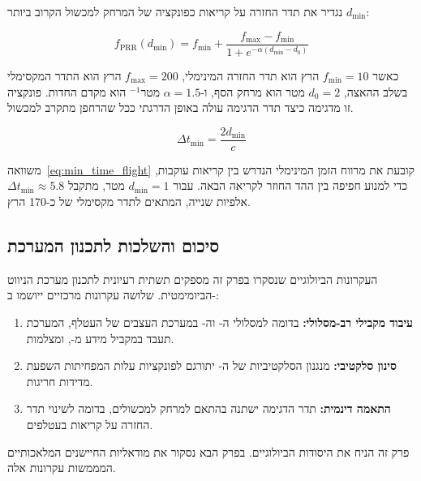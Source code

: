 נגדיר את תדר החזרה על קריאות כפונקציה של המרחק למכשול הקרוב ביותר
$d_{\min}$:

\begin{equation}
    f_{\text{PRR}}(d_{\min}) = f_{\min} +
    \frac{f_{\max} - f_{\min}}{1 + e^{-\alpha(d_{\min} - d_0)}}
    \label{eq:bat_pulse_rate}
\end{equation}

כאשר $f_{\min} = 10$ הרץ הוא תדר החזרה המינימלי,
$f_{\max} = 200$ הרץ הוא התדר המקסימלי בשלב ההאצה,
$d_0 = 2$ מטר הוא מרחק הסף, ו-$\alpha = 1.5$ מטר$^{-1}$ הוא
מקדם החדות. פונקציה זו מדגימה כיצד תדר הדגימה עולה באופן
הדרגתי ככל שהרחפן מתקרב למכשול.

\begin{equation}
    \Delta t_{\text{min}} = \frac{2 d_{\min}}{c}
    \label{eq:min_time_flight}
\end{equation}

משוואה~\ref{eq:min_time_flight} קובעת את מרווח הזמן המינימלי
הנדרש בין קריאות עוקבות, כדי למנוע חפיפה בין ההד החוזר
לקריאה הבאה. עבור $d_{\min} = 1$ מטר, מתקבל
$\Delta t_{\text{min}} \approx 5.8$ אלפיות שנייה,
המתאים לתדר מקסימלי של כ-170 הרץ.

\subsection{סיכום והשלכות לתכנון המערכת}
\label{subsec:bio_summary}

העקרונות הביולוגיים שנסקרו בפרק זה מספקים תשתית רעיונית לתכנון
מערכת הניווט הביומימטית. שלושה עקרונות מרכזיים ייושמו ב-:

\begin{enumerate}
    \item \textbf{עיבוד מקבילי רב-מסלולי:} בדומה למסלולי ה- וה-
    במערכת העצבים של העטלף, המערכת תעבד במקביל מידע מ-,
     ומצלמות.
    \item \textbf{סינון סלקטיבי:} מנגנון הסלקטיביות של ה- יתורגם
    לפונקציות עלות  המפחיתות השפעת מדידות חריגות.
    \item \textbf{התאמה דינמית:} תדר הדגימה ישתנה בהתאם למרחק למכשולים,
    בדומה לשינוי תדר החזרה על קריאות בעטלפים.
\end{enumerate}

פרק זה הניח את היסודות הביולוגיים. בפרק הבא נסקור את מודאליות
החיישנים המלאכותיים המממשות עקרונות אלה.